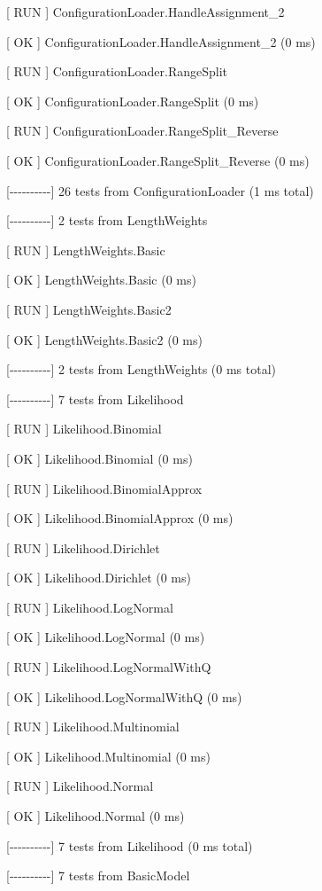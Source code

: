 \documentclass[a4paper,11pt,twoside,pdftex,draft]{article}
\begin{document}
{[} RUN {]} ConfigurationLoader.HandleAssignment\_2

{[} OK {]} ConfigurationLoader.HandleAssignment\_2 (0 ms)

{[} RUN {]} ConfigurationLoader.RangeSplit

{[} OK {]} ConfigurationLoader.RangeSplit (0 ms)

{[} RUN {]} ConfigurationLoader.RangeSplit\_Reverse

{[} OK {]} ConfigurationLoader.RangeSplit\_Reverse (0 ms)

{[}-\/-\/-\/-\/-\/-\/-\/-\/-\/-{]} 26 tests from ConfigurationLoader (1
ms total)

{[}-\/-\/-\/-\/-\/-\/-\/-\/-\/-{]} 2 tests from LengthWeights

{[} RUN {]} LengthWeights.Basic

{[} OK {]} LengthWeights.Basic (0 ms)

{[} RUN {]} LengthWeights.Basic2

{[} OK {]} LengthWeights.Basic2 (0 ms)

{[}-\/-\/-\/-\/-\/-\/-\/-\/-\/-{]} 2 tests from LengthWeights (0 ms
total)

{[}-\/-\/-\/-\/-\/-\/-\/-\/-\/-{]} 7 tests from Likelihood

{[} RUN {]} Likelihood.Binomial

{[} OK {]} Likelihood.Binomial (0 ms)

{[} RUN {]} Likelihood.BinomialApprox

{[} OK {]} Likelihood.BinomialApprox (0 ms)

{[} RUN {]} Likelihood.Dirichlet

{[} OK {]} Likelihood.Dirichlet (0 ms)

{[} RUN {]} Likelihood.LogNormal

{[} OK {]} Likelihood.LogNormal (0 ms)

{[} RUN {]} Likelihood.LogNormalWithQ

{[} OK {]} Likelihood.LogNormalWithQ (0 ms)

{[} RUN {]} Likelihood.Multinomial

{[} OK {]} Likelihood.Multinomial (0 ms)

{[} RUN {]} Likelihood.Normal

{[} OK {]} Likelihood.Normal (0 ms)

{[}-\/-\/-\/-\/-\/-\/-\/-\/-\/-{]} 7 tests from Likelihood (0 ms total)

{[}-\/-\/-\/-\/-\/-\/-\/-\/-\/-{]} 7 tests from BasicModel
\end{document}
